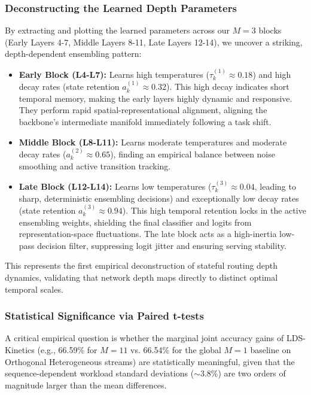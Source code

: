 \subsubsection{Deconstructing the Learned Depth Parameters}
By extracting and plotting the learned parameters across our $M=3$ blocks (Early Layers 4-7, Middle Layers 8-11, Late Layers 12-14), we uncover a striking, depth-dependent ensembling pattern:
\begin{itemize}
    \item \textbf{Early Block (L4-L7):} Learns high temperatures ($\tau^{(1)}_k \approx 0.18$) and high decay rates (state retention $a^{(1)}_k \approx 0.32$). This high decay indicates short temporal memory, making the early layers highly dynamic and responsive. They perform rapid spatial-representational alignment, aligning the backbone's intermediate manifold immediately following a task shift.
    \item \textbf{Middle Block (L8-L11):} Learns moderate temperatures and moderate decay rates ($a^{(2)}_k \approx 0.65$), finding an empirical balance between noise smoothing and active transition tracking.
    \item \textbf{Late Block (L12-L14):} Learns low temperatures ($\tau^{(3)}_k \approx 0.04$, leading to sharp, deterministic ensembling decisions) and exceptionally low decay rates (state retention $a^{(3)}_k \approx 0.94$). This high temporal retention locks in the active ensembling weights, shielding the final classifier and logits from representation-space fluctuations. The late block acts as a high-inertia low-pass decision filter, suppressing logit jitter and ensuring serving stability.
\end{itemize}
This represents the first empirical deconstruction of stateful routing depth dynamics, validating that network depth maps directly to distinct optimal temporal scales.

\subsubsection{Statistical Significance via Paired t-tests}
A critical empirical question is whether the marginal joint accuracy gains of LDS-Kinetics (e.g., 66.59\% for $M=11$ vs. 66.54\% for the global $M=1$ baseline on Orthogonal Heterogeneous streams) are statistically meaningful, given that the sequence-dependent workload standard deviations ($\sim$3.8\%) are two orders of magnitude larger than the mean differences. 

